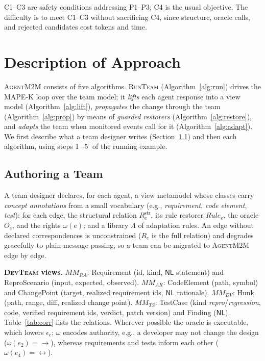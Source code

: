 \documentclass[10pt, anonymous, conference]{IEEEtran}
\theoremstyle{definition}
\theoremstyle{plain}
\theoremstyle{remark}
\newcommand{\tool}{\textsc{AgentM2M}}
\newcommand{\devteam}{\textsc{DevTeam}}
\newcommand{\MM}{\mathit{MM}}
\newcommand{\str}{\mathrm{str}}
\newcommand{\NL}{\mathsf{NL}}
\newcommand{\cls}[1]{\textsf{#1}}
\newcommand{\step}[1]{\textcircled{\scriptsize #1}}
\begin{document}
C1--C3 are safety conditions addressing P1--P3; C4 is the usual objective.
The difficulty is to meet C1--C3 without sacrificing C4, since structure,
oracle calls, and rejected candidates cost tokens and time.






\section{Description of Approach}\label{sec:approach}

\tool{} consists of five algorithms. \textsc{RunTeam}
(Algorithm~\ref{alg:run}) drives the MAPE-K loop over the team model; it
\emph{lifts} each agent response into a view model
(Algorithm~\ref{alg:lift}), \emph{propagates} the change through the team
(Algorithm~\ref{alg:prop}) by means of \emph{guarded restorers}
(Algorithm~\ref{alg:restore}), and \emph{adapts} the team when monitored events
call for it (Algorithm~\ref{alg:adapt}). We first describe what a team
designer writes (Section~\ref{subsec:authoring}) and then each algorithm, using
steps \step{1}--\step{5} of the running example.

\subsection{Authoring a Team}\label{subsec:authoring}
A team designer declares, for each agent, a view metamodel whose classes carry
\emph{concept annotations} from a small vocabulary (e.g.,
\emph{requirement}, \emph{code element}, \emph{test}); for each edge, the
structural relation $R_e^{\str}$, its rule restorer $\mathit{Rule}_e$, the
oracle $O_e$, and the rights $\omega(e)$; and a library $\Lambda$ of adaptation
rules. An edge without declared correspondences is unconstrained
($R_e$ is the full relation) and degrades gracefully to plain message
passing, so a team can be migrated to \tool{} edge by edge.

\smallskip\noindent\textbf{\devteam{} views.} $\MM_{\mathit{RA}}$:
\cls{Requirement} (id, kind, $\NL$ statement) and \cls{ReproScenario} (input,
expected, observed). $\MM_{\mathit{AR}}$: \cls{CodeElement} (path, symbol) and
\cls{ChangePoint} (target, realized requirement ids, $\NL$ rationale).
$\MM_{\mathit{DV}}$: \cls{Hunk} (path, range, diff, realized change point).
$\MM_{\mathit{TS}}$: \cls{TestCase} (kind \emph{repro}/\emph{regression}, code,
verified requirement ids, verdict, patch version) and \cls{Finding} ($\NL$).
Table~\ref{tab:corr} lists the relations. Wherever possible the oracle is
executable, which lowers $\epsilon_e$; $\omega$ encodes authority, e.g., a
developer may not change the design ($\omega(e_2)={\rightarrow}$), whereas
requirements and tests inform each other ($\omega(e_4)={\leftrightarrow}$).
\end{document}

